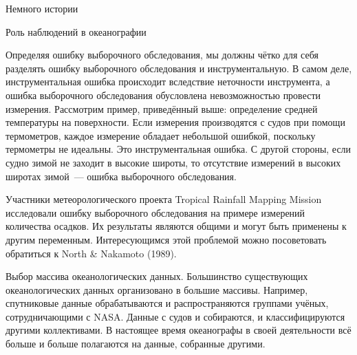 \begin{chapter}{Немного истории}
\begin{section}{Роль наблюдений в океанографии}
{{Определяя ошибку выборочного обследования, мы должны чётко для себя разделять 
ошибку выборочного обследования и инструментальную. В самом деле,
инструментальная ошибка происходит вследствие неточности инструмента,
а ошибка выборочного обследования обусловлена невозможностью провести 
измерения. Рассмотрим пример, приведённый выше: определение средней температуры 
на поверхности. Если измерения производятся с судов при помощи термометров, 
каждое измерение обладает небольшой ошибкой, поскольку термометры не идеальны. 
Это инструментальная ошибка. С другой стороны, если судно зимой не заходит 
в высокие широты, то отсутствие  измерений в высоких широтах зимой~--- ошибка 
выборочного обследования.
%

Участники метеорологического проекта Tropical Rainfall Mapping Mission 
исследовали ошибку выборочного обследования на примере измерений количества осадков. 
Их результаты являются общими и могут быть применены к другим переменным. 
Интересующимся этой проблемой можно посоветовать обратиться к North \& Nakamoto (1989).
%
}%
}

\begin{paragraph}{Выбор массива океанологических данных.}
Большинство существующих
океанологических данных организовано в большие массивы.
Например, спутниковые данные обрабатываются и распространяются
группами учёных, сотрудничающими с NASA. Данные с судов и собираются, и
классифицируются другими коллективами. В настоящее время океанографы в своей 
деятельности всё больше и больше полагаются на данные, собранные другими.
%



\end{paragraph}
\end{section}
\end{chapter}
